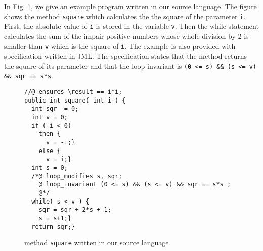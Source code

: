 In Fig. \ref{pogComp:source:example}, we give an example program written in our source language. The figure shows 
the method \lstinline!square! which calculates the 
the   square of the parameter \lstinline!i!. First, the absolute value of \lstinline!i! is stored in the variable \lstinline!v!.
Then  the while statement  calculates the sum of the impair positive numbers whose whole division by 2 is smaller than
\lstinline!v! which is the square of \lstinline!i!.  The example is also
provided with specification written in JML. The specification states
that the method returns the square of its parameter and that the loop
invariant is \lstinline!(0 <= s) && (s <= v) && sqr == s*s!.

\begin{figure}[ht!]
 \begin{lstlisting}[frame=trbl] 
//@ ensures \result == i*i; 
public int square( int i ) {
  int sqr  = 0;
  int v = 0;
  if ( i < 0)
    then {
      v = -i;} 
    else {
      v = i;}
  int s = 0;
  /*@ loop_modifies s, sqr;
    @ loop_invariant (0 <= s) && (s <= v) && sqr == s*s ;
    @*/
  while( s < v ) {
    sqr = sqr + 2*s + 1;
    s = s+1;}
  return sqr;}
\end{lstlisting}
\caption{\sc method  \lstinline!square! written in our source language}
\label{pogComp:source:example}

\end{figure}
